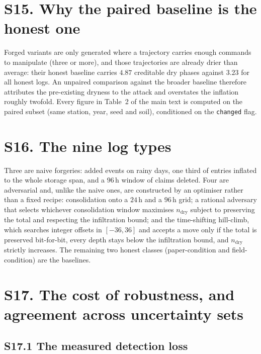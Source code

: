 \section*{S15. Why the paired baseline is the honest one}

Forged variants are only generated where a trajectory carries enough commands
to manipulate (three or more), and those trajectories are already drier than
average: their honest baseline carries $4.87$ creditable dry phases against
$3.23$ for all honest logs. An unpaired comparison against the broader baseline
therefore attributes the pre-existing dryness to the attack and overstates the
inflation roughly twofold. Every figure in Table~2 of the main text is computed
on the paired subset (same station, year, seed and soil), conditioned on the
\texttt{changed} flag.

\section*{S16. The nine log types}

Three are naive forgeries: added events on rainy days,
one third of entries inflated to the whole storage span, and a $96$\,h window
of claims deleted. Four are adversarial and, unlike the naive ones, are
constructed by an optimiser rather than a fixed recipe: consolidation onto a
$24$\,h and a $96$\,h grid; a rational adversary that selects whichever
consolidation window maximises $n_{\mathrm{dry}}$ subject to preserving the
total and respecting the infiltration bound; and the time-shifting hill-climb,
which searches integer offsets in $[-36,36]$ and accepts a move only if the
total is preserved bit-for-bit, every depth stays below the infiltration bound,
and $n_{\mathrm{dry}}$ strictly increases. The remaining two honest classes
(paper-condition and field-condition) are the baselines.

\section*{S17. The cost of robustness, and agreement across uncertainty sets}

\subsection*{S17.1 The measured detection loss}

